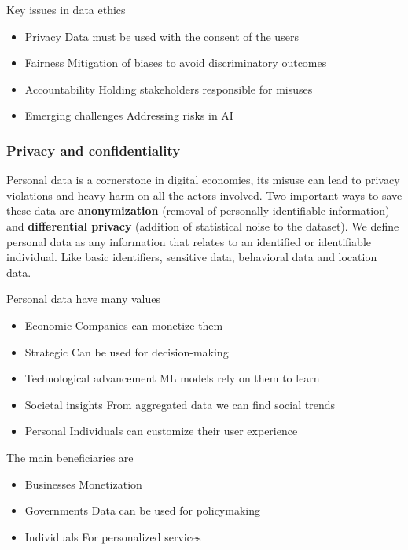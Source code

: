 Key issues in data ethics 

\begin{itemize}
    \item Privacy \ra Data must be used with the consent of the users
    \item Fairness \ra Mitigation of biases to avoid discriminatory outcomes
    \item Accountability \ra Holding stakeholders responsible for misuses
    \item Emerging challenges \ra Addressing risks in AI
\end{itemize}














\subsubsection{Privacy and confidentiality}

Personal data is a cornerstone in digital economies, its misuse can lead to privacy violations and heavy harm on all the actors involved. Two important ways to save these data are \textbf{anonymization} (removal of personally identifiable information) and \textbf{differential privacy} (addition of statistical noise to the dataset). We define personal data as any information that relates to an identified or identifiable individual. Like basic identifiers, sensitive data, behavioral data and location data. 

Personal data have many values
\begin{itemize}
    \item Economic \ra Companies can monetize them
    \item Strategic \ra Can be used for decision-making
    \item Technological advancement \ra ML models rely on them to learn
    \item Societal insights \ra From aggregated data we can find social trends
    \item Personal \ra Individuals can customize their user experience
\end{itemize}

The main beneficiaries are
\begin{itemize}
    \item Businesses \ra Monetization
    \item Governments \ra Data can be used for policymaking
    \item Individuals \ra For personalized services
\end{itemize}

